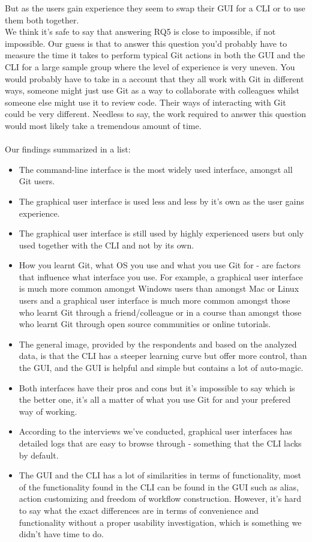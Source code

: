 \documentclass[a4paper,oneside]{bth} %
\begin{document}
				But as the users gain experience they seem to swap their GUI for a CLI or to use them both together.\\
				We think it's safe to say that answering RQ5 is close to impossible, if not impossible.
				Our guess is that to answer this question you'd probably have to measure the time it takes to perform typical Git actions in both the GUI and the CLI for a large sample group where the level of experience is very uneven. You would probably have to take in a account that they all work with Git in different ways, someone might just use Git as a way to collaborate with colleagues whilst someone else might use it to review code. Their ways of interacting with Git could be very different. Needless to say, the work required to answer this question would most likely take a tremendous amount of time.
				\\\\
				Our findings summarized in a list:
				\begin{itemize}
					\item The command-line interface is the most widely used interface, amongst all Git users.
					\item The graphical user interface is used less and less by it's own as the user gains experience.
					\item The graphical user interface is still used by highly experienced users but only used together with the CLI and not by its own.
					\item How you learnt Git, what OS you use and what you use Git for - are factors that influence what interface you use. For example, a graphical user interface is much more common amongst Windows users than amongst Mac or Linux users and a graphical user interface is much more common amongst those who learnt Git through a friend/colleague or in a course than amongst those who learnt Git through open source communities or online tutorials.
					\item The general image, provided by the respondents and based on the analyzed data, is that the CLI has a steeper learning curve but offer more control, than the GUI, and the GUI is helpful and simple but contains a lot of auto-magic.
					\item Both interfaces have their pros and cons but it's impossible to say which is the better one, it's all a matter of what you use Git for and your prefered way of working.
					\item According to the interviews we've conducted, graphical user interfaces has detailed logs that are easy to browse through - something that the CLI lacks by default.
					\item The GUI and the CLI has a lot of similarities in terms of functionality, most of the functionality found in the CLI can be found in the GUI such as alias, action customizing and freedom of workflow construction. However, it's hard to say what the exact differences are in terms of convenience and functionality without a proper usability investigation, which is something we didn't have time to do.				 
				\end{itemize}
				
\end{document}
